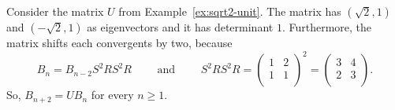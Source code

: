 \begin{example}
  Consider the matrix $U$ from Example~\ref{ex:sqrt2-unit}.
  The matrix has $(\sqrt{2}, 1)$ and $(-\sqrt{2}, 1)$ as eigenvectors
  and it has determinant $1$.
  Furthermore, the matrix shifts each convergents by two,
  because
  \[
    B_n = B_{n-2} S^2 R S^2 R
    \qquad
    \text{ and }
    \qquad
    S^2 R S^2 R =
    \begin{pmatrix}
      1 & 2 \\
      1 & 1 \\
    \end{pmatrix}^2
    =
    \begin{pmatrix}
      3 & 4 \\
      2 & 3 \\
    \end{pmatrix}.
  \]
  So, $B_{n+2} = U B_n$ for every $n ≥ 1$.
\end{example}
